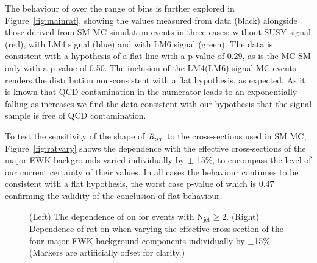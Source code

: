 The behaviour of \RaT over the range of \HT bins is further explored in Figure~\ref{fig:mainrat}, showing the values measured from data (black) alongside those derived from SM MC simulation events in three cases: without SUSY signal (red), with LM4 signal (blue) and with LM6 signal (green). The data is consistent with a hypothesis of a flat line with a p-value of 0.29, as is the MC SM only with a p-value of 0.50. The inclusion of the LM4(LM6) signal MC events renders the distribution non-consistent with a flat hypothesis, as expected. As it is known that QCD contamination in the numerator leads to an exponentially falling \RaT as \HT increases we find the data consistent with our hypothesis that the signal sample is free of QCD contamination.

To test the sensitivity of the shape of $R_{\alpha_{\text{T}}}$ to the cross-sections used in SM MC, Figure~\ref{fig:ratvary} shows the \HT dependence with the effective cross-sections of the major EWK backgrounds varied individually by $\pm$ 15\%, to encompass the level of our current certainty of their values. In all cases the behaviour continues to be consistent with a flat hypothesis, the worst case p-value of which is 0.47 confirming the validity of the conclusion of flat behaviour.

\begin{figure}[h]
  \begin{center}
      \caption{\label{fig:rat_vs_ht} (Left) The dependence of \RaT on
      \HT for events with N$_{\mathrm{jet}} \geq 2$. (Right) Dependence of rat on
      \HT when varying the effective cross-section of the four major
      EWK background components individually by $\pm$15\%. (Markers
      are artificially offset for clarity.) }
  \end{center}
\end{figure}

